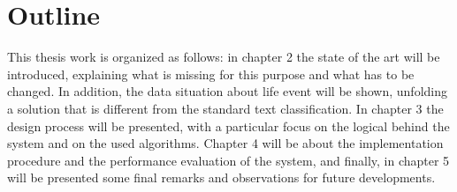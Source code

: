 \section{Outline}

This thesis work is organized as follows: in chapter 2 the state of the art will be introduced, explaining what is missing for this purpose and what has to be changed. In addition, the data situation about life event will be shown, unfolding a solution that is different from the standard text classification. In chapter 3 the design process will be presented, with a particular focus on the logical behind the system and on the used algorithms. Chapter 4 will be about the implementation procedure and the performance evaluation of the system, and finally, in chapter 5 will be presented some final remarks and observations for future developments.


